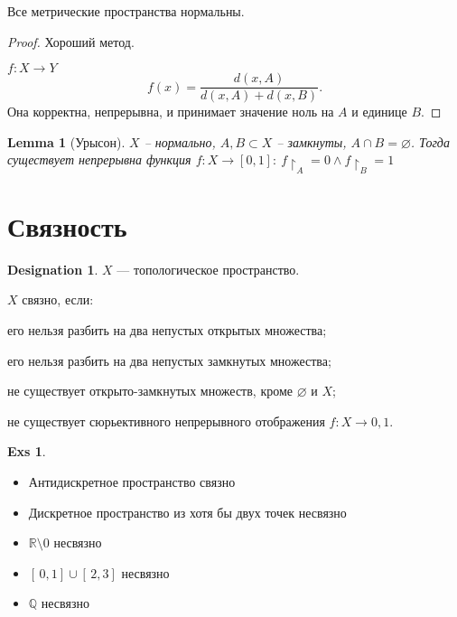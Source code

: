 \documentclass[11pt]{book}
\newcommand{\R}{\mathbb{R}}
\newcommand{\Q}{\mathbb{Q}}
\theoremstyle{definition}
\theoremstyle{plain}
\theoremstyle{plain}
\newtheorem*{lm}{Lemma}
\theoremstyle{definition}
\newtheorem*{exs}{Exs}
\newtheorem*{name}{Designation}
\theoremstyle{remark}
\begin{document}
\begin{defn}
    Все метрические пространства нормальны.
\end{defn}
\begin{proof}
    Хороший метод.

    $ f: X \to  Y$
    \[
	f(x) = \frac{d(x, A)}{d(x, A) + d(x, B)}
    .\]
    Она корректна, непрерывна, и принимает значение ноль на $ A$  и  единице $ B$.
\end{proof}
\begin{lm}[Урысон]
    $ X$ -- нормально, $ A, B \subset  X$ -- замкнуты, $ A \cap  B = \varnothing$. Тогда существует непрерывна функция $ f: X \to  [0, 1]: ~ f\upharpoonright_A = 0 \wedge f\upharpoonright_B = 1$

\end{lm}
\section{Связность}
\begin{name}
    $ X$ ---  топологическое пространство.
\end{name}
\begin{defn}
    $ $\\
    $ X$ связно, если:
    \begin{description}
	\item  его нельзя разбить на два непустых открытых множества;
	\item его нельзя разбить на два непустых замкнутых множества;
	\item не существует открыто-замкнутых множеств, кроме $ \varnothing$ и $ X$;
	\item не существует сюрьективного непрерывного отображения $ f: X \to  {0, 1}$.
    \end{description}
\end{defn}
\begin{exs}
    $ $
    \begin{itemize}
	\item Антидискретное пространство связно
	\item Дискретное пространство из хотя бы двух точек несвязно
	\item $ \R \setminus {0}$ несвязно
	\item $[\,0,1] \cup [\,2, 3]$ несвязно
	\item $ \Q$ несвязно
    \end{itemize}
\end{exs}
\end{document}
